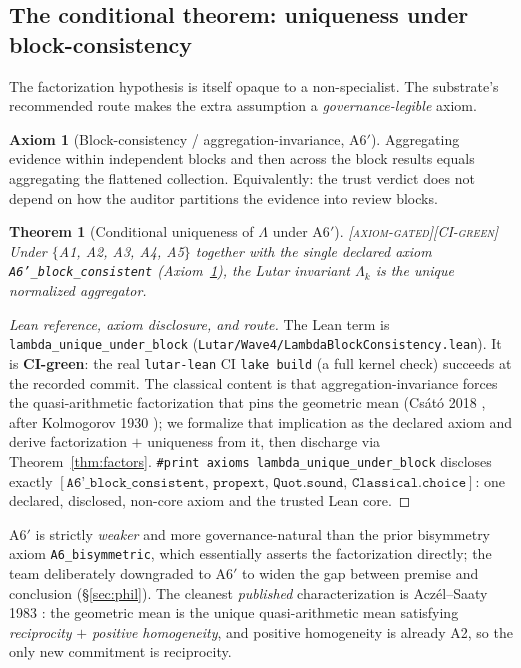 \documentclass[11pt]{article}
\theoremstyle{plain}
\newtheorem{theorem}{Theorem}[section]
\theoremstyle{definition}
\newtheorem{axiom}{Axiom}
\theoremstyle{remark}
\newcommand{\statusAxiom}{\textcolor{orange!80!black}{\textsc{[axiom-gated]}}}
\newcommand{\statusCI}{\textcolor{szlteal}{\textsc{[CI-green]}}}
\newcommand{\La}{\Lambda}
\newcommand{\printax}[1]{\texttt{\#print axioms}~\texttt{#1}}
\begin{document}
\subsection{The conditional theorem: uniqueness under block-consistency}
The factorization hypothesis is itself opaque to a non-specialist. The substrate's
recommended route makes the extra assumption a \emph{governance-legible} axiom.

\begin{axiom}[Block-consistency / aggregation-invariance, A6$'$]
\label{ax:a6p}
Aggregating evidence within independent blocks and then across the block results
equals aggregating the flattened collection. Equivalently: the trust verdict does
not depend on how the auditor partitions the evidence into review blocks.
\end{axiom}

\begin{theorem}[Conditional uniqueness of $\La$ under A6$'$]
\label{thm:cond}
\statusAxiom\;\statusCI\;
Under $\{$A1, A2, A3, A4, A5$\}$ together with the single declared axiom
\texttt{A6'\_block\_consistent} (Axiom~\ref{ax:a6p}), the Lutar invariant $\La_k$ is
the unique normalized aggregator.
\end{theorem}
\begin{proof}[Lean reference, axiom disclosure, and route]
The Lean term is \texttt{lambda\_unique\_under\_block}
(\texttt{Lutar/Wave4/LambdaBlockConsistency.lean}). It is \textbf{CI-green}: the
real \texttt{lutar-lean} CI \texttt{lake build} (a full kernel check) succeeds at
the recorded commit. The classical content is that aggregation-invariance forces the
quasi-arithmetic factorization that pins the geometric mean (Cs\'at\'o 2018
\cite{csato2018}, after Kolmogorov 1930 \cite{kolmogorov1930}); we formalize that
implication as the declared axiom and derive factorization $+$ uniqueness from it,
then discharge via Theorem~\ref{thm:factors}. \printax{lambda\_unique\_under\_block}
discloses exactly
$[\texttt{A6'\_block\_consistent},\,\texttt{propext},\,\texttt{Quot.sound},\,\texttt{Classical.choice}]$:
one declared, disclosed, non-core axiom and the trusted Lean core.
\end{proof}

A6$'$ is strictly \emph{weaker} and more governance-natural than the prior
bisymmetry axiom \texttt{A6\_bisymmetric}, which essentially asserts the
factorization directly; the team deliberately downgraded to A6$'$ to widen the gap
between premise and conclusion (\S\ref{sec:phil}). The cleanest \emph{published}
characterization is Acz\'el--Saaty 1983 \cite{aczelsaaty1983}: the geometric mean is
the unique quasi-arithmetic mean satisfying \emph{reciprocity} $+$ \emph{positive
homogeneity}, and positive homogeneity is already A2, so the only new commitment is
reciprocity.
\end{document}
